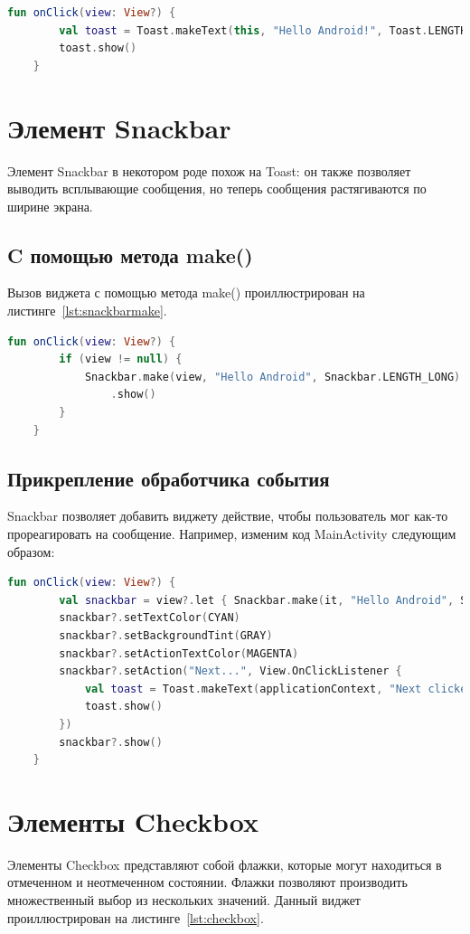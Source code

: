 \begin{lstlisting}[language=Kotlin, caption=\leftline{toast}, label=lst:toast]
fun onClick(view: View?) {
        val toast = Toast.makeText(this, "Hello Android!", Toast.LENGTH_LONG)
        toast.show()
    }
\end{lstlisting}

\section{Элемент Snackbar}
Элемент Snackbar в некотором роде похож на Toast: он также позволяет 
выводить всплывающие сообщения, но теперь сообщения растягиваются по 
ширине экрана.

\subsection{C помощью метода make()}
Вызов виджета с помощью метода make() проиллюстрирован на листинге~\ref{lst:snackbarmake}.
\begin{lstlisting}[language=Kotlin, caption=\leftline{snackbar}, label=lst:snackbarmake]
fun onClick(view: View?) {
        if (view != null) {
            Snackbar.make(view, "Hello Android", Snackbar.LENGTH_LONG)
                .show()
        }
    }
\end{lstlisting}
\subsection{Прикрепление обработчика события}
Snackbar позволяет добавить виджету действие, чтобы пользователь мог как-то прореагировать на сообщение.
Например, изменим код MainActivity следующим образом:
\begin{lstlisting}[language=Kotlin, caption=\leftline{setAction}, label=lst:setAction]
fun onClick(view: View?) {
        val snackbar = view?.let { Snackbar.make(it, "Hello Android", Snackbar.LENGTH_LONG) }
        snackbar?.setTextColor(CYAN)
        snackbar?.setBackgroundTint(GRAY)
        snackbar?.setActionTextColor(MAGENTA)
        snackbar?.setAction("Next...", View.OnClickListener {
            val toast = Toast.makeText(applicationContext, "Next clicked!", Toast.LENGTH_LONG)
            toast.show()
        })
        snackbar?.show()
    }
\end{lstlisting}
\section{Элементы Checkbox}
Элементы Checkbox представляют собой флажки, которые могут 
находиться в отмеченном и неотмеченном состоянии.
Флажки позволяют производить множественный выбор из нескольких значений.
Данный виджет проиллюстрирован на листинге~\ref{lst:checkbox}.

